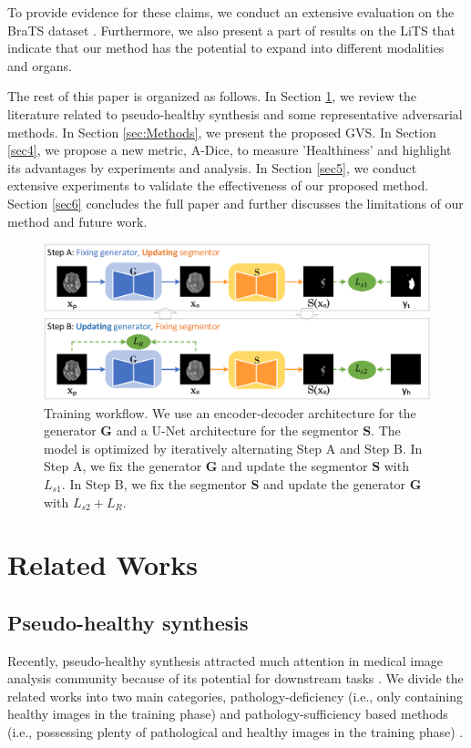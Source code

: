 \documentclass[journal,twoside,web]{ieeecolor}
\begin{document}
To provide evidence for these claims, we conduct an extensive evaluation on the BraTS dataset \cite{bakas2017advancing,menze2014multimodal,bakas2018identifying}.  Furthermore, we also present a part of results on the LiTS \cite{bilic2019liver} that indicate that our method has the potential to expand into different modalities and organs. 

The rest of this paper is organized as follows. In Section \ref{sec:RelatedWorks}, we review the literature related to pseudo-healthy synthesis and some representative adversarial methods. In Section \ref{sec:Methods}, we present the proposed GVS. In Section \ref{sec4}, we propose a new metric, A-Dice, to measure 'Healthiness' and highlight its advantages by experiments and analysis. In Section \ref{sec5}, we conduct extensive experiments to validate the effectiveness of our proposed method. Section \ref{sec6} concludes the full paper and further discusses the limitations of our method and future work.

\begin{figure}[htbp]
	\centering
	\includegraphics[width=\textwidth]{./figs/framework.pdf}
	\caption{Training workflow. We use an encoder-decoder architecture for the generator $\mathbf{G}$ and a U-Net architecture for the segmentor $\mathbf{S}$. The model is optimized by iteratively alternating Step A and Step B. In Step A, we fix the generator $\mathbf{G}$ and update the segmentor $\mathbf{S}$ with $L_{s1}$. In Step B, we fix the segmentor $\mathbf{S}$ and update  the generator $\mathbf{G}$ with $L_{s2}+L_R$.}
	\label{fig2}
\end{figure}

\section{Related Works}
\label{sec:RelatedWorks}
\subsection{Pseudo-healthy synthesis}
Recently, pseudo-healthy synthesis attracted much attention in medical image analysis community because of its potential for downstream tasks \cite{bowles2017brain,ye2013modality,sun2020adversarial,andermatt2018pathology,tsunoda2014pseudo,chen2018unsupervised,baumgartner2018visual,xia2020pseudo}. We divide the related works into two main categories,  pathology-deficiency (i.e., only containing healthy images in the training phase) \cite{chen2018unsupervised,sato2018primitive,schlegl2019f} and pathology-sufficiency based methods (i.e., possessing plenty of pathological and healthy images in the training phase) \cite{baumgartner2018visual,sun2020adversarial,xia2020pseudo}.
\end{document}
